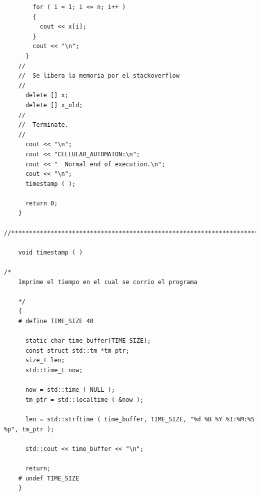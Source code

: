 \documentclass[11pt]{article}
\begin{document}
\begin{verbatim}
	    for ( i = 1; i <= n; i++ )
	    {
	      cout << x[i];
	    }
	    cout << "\n";
	  }
	//
	//  Se libera la memoria por el stackoverflow
	//
	  delete [] x;
	  delete [] x_old;
	//
	//  Terminate.
	//
	  cout << "\n";
	  cout << "CELLULAR_AUTOMATON:\n";
	  cout << "  Normal end of execution.\n";
	  cout << "\n";
	  timestamp ( );

	  return 0;
	}
	//****************************************************************************80

	void timestamp ( )

/*
	Imprime el tiempo en el cual se corrio el programa

	*/
	{
	# define TIME_SIZE 40

	  static char time_buffer[TIME_SIZE];
	  const struct std::tm *tm_ptr;
	  size_t len;
	  std::time_t now;

	  now = std::time ( NULL );
	  tm_ptr = std::localtime ( &now );

	  len = std::strftime ( time_buffer, TIME_SIZE, "%d %B %Y %I:%M:%S %p", tm_ptr );

	  std::cout << time_buffer << "\n";

	  return;
	# undef TIME_SIZE
	}

\end{verbatim}
\end{document}
